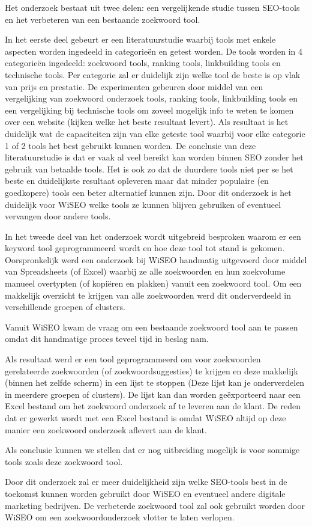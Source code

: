 Het onderzoek bestaat uit twee delen: een vergelijkende studie tussen SEO-tools en het verbeteren van een bestaande zoekwoord tool.

In het eerste deel gebeurt er een literatuurstudie waarbij tools met enkele aspecten worden ingedeeld in categorieën en getest worden. De tools worden in 4 categorieën ingedeeld: zoekwoord tools, ranking tools, linkbuilding tools en technische tools. Per categorie zal er duidelijk zijn welke tool de beste is op vlak van prijs en prestatie. De experimenten gebeuren door middel van een vergelijking van zoekwoord onderzoek tools, ranking tools, linkbuilding tools en een vergelijking bij technische tools om zoveel mogelijk info te weten te komen over een website (kijken welke het beste resultaat levert). Als resultaat is het duidelijk wat de capaciteiten zijn van elke geteste tool waarbij voor elke categorie 1 of 2 tools het best gebruikt kunnen worden. De conclusie van deze literatuurstudie is dat er vaak al veel bereikt kan worden binnen SEO zonder het gebruik van betaalde tools. Het is ook zo dat de duurdere tools niet per se het beste en duidelijkste resultaat opleveren maar dat minder populaire (en goedkopere) tools een beter alternatief kunnen zijn. Door dit onderzoek is het duidelijk voor WiSEO welke tools ze kunnen blijven gebruiken of eventueel vervangen door andere tools. 

In het tweede deel van het onderzoek wordt uitgebreid besproken waarom er een keyword tool geprogrammeerd wordt en hoe deze tool tot stand is gekomen. Oorspronkelijk werd een onderzoek bij WiSEO handmatig uitgevoerd door middel van Spreadsheets (of Excel) waarbij ze alle zoekwoorden en hun zoekvolume manueel overtypten (of kopiëren en plakken) vanuit een zoekwoord tool. Om een makkelijk overzicht te krijgen van alle zoekwoorden werd dit onderverdeeld in verschillende groepen of clusters. 

Vanuit WiSEO kwam de vraag om een bestaande zoekwoord tool aan te passen omdat dit handmatige proces teveel tijd in beslag nam. 

 Als resultaat werd er een tool geprogrammeerd om voor zoekwoorden gerelateerde zoekwoorden (of zoekwoordsuggesties) te krijgen en deze makkelijk (binnen het zelfde scherm) in een lijst te stoppen (Deze lijst kan je onderverdelen in meerdere groepen of clusters). De lijst kan dan worden geëxporteerd naar een Excel bestand om het zoekwoord onderzoek af te leveren aan de klant. De reden dat er gewerkt wordt met een Excel bestand is omdat WiSEO altijd op deze manier een zoekwoord onderzoek aflevert aan de klant. 

Als conclusie kunnen we stellen dat er nog uitbreiding mogelijk is voor sommige tools zoals deze zoekwoord tool.

Door dit onderzoek zal er meer duidelijkheid zijn welke SEO-tools best in de toekomst kunnen worden gebruikt door WiSEO en eventueel andere digitale marketing bedrijven. De verbeterde zoekwoord tool zal ook gebruikt worden door WiSEO om een zoekwoordonderzoek vlotter te laten verlopen. 
